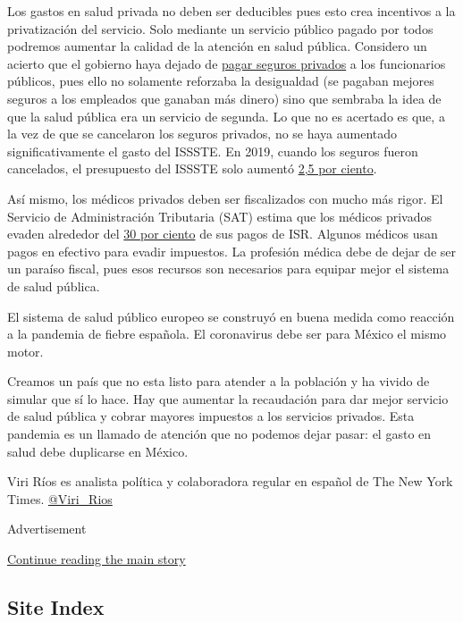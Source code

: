 Los gastos en salud privada no deben ser deducibles pues esto crea
incentivos a la privatización del servicio. Solo mediante un servicio
público pagado por todos podremos aumentar la calidad de la atención en
salud pública. Considero un acierto que el gobierno haya dejado de
\href{https://www.eleconomista.com.mx/politica/Seguros-para-burocratas-costaban-al-gobierno-11000-millones-de-pesos-al-ano-20190901-0029.html}{pagar
seguros privados} a los funcionarios públicos, pues ello no solamente
reforzaba la desigualdad (se pagaban mejores seguros a los empleados que
ganaban más dinero) sino que sembraba la idea de que la salud pública
era un servicio de segunda. Lo que no es acertado es que, a la vez de
que se cancelaron los seguros privados, no se haya aumentado
significativamente el gasto del ISSSTE. En 2019, cuando los seguros
fueron cancelados, el presupuesto del ISSSTE solo aumentó
\href{https://ciep.mx/la-contraccion-del-gasto-per-capita-en-salud-2010-2020/}{2,5
por ciento}.

Así mismo, los médicos privados deben ser fiscalizados con mucho más
rigor. El Servicio de Administración Tributaria (SAT) estima que los
médicos privados evaden alrededor del
\href{http://omawww.sat.gob.mx/gobmxtransparencia/Paginas/documentos/estudio_opiniones/EvasionActividadesProfesionales.pdf}{30
por ciento} de sus pagos de ISR. Algunos médicos usan pagos en efectivo
para evadir impuestos. La profesión médica debe de dejar de ser un
paraíso fiscal, pues esos recursos son necesarios para equipar mejor el
sistema de salud pública.

El sistema de salud público europeo se construyó en buena medida como
reacción a la pandemia de fiebre española. El coronavirus debe ser para
México el mismo motor.

Creamos un país que no esta listo para atender a la población y ha
vivido de simular que sí lo hace. Hay que aumentar la recaudación para
dar mejor servicio de salud pública y cobrar mayores impuestos a los
servicios privados. Esta pandemia es un llamado de atención que no
podemos dejar pasar: el gasto en salud debe duplicarse en México.

Viri Ríos es analista política y colaboradora regular en español de The
New York Times. \href{https://twitter.com/Viri_Rios}{@Viri\_Rios}

Advertisement

\protect\hyperlink{after-bottom}{Continue reading the main story}

\hypertarget{site-index}{%
\subsection{Site Index}\label{site-index}}

